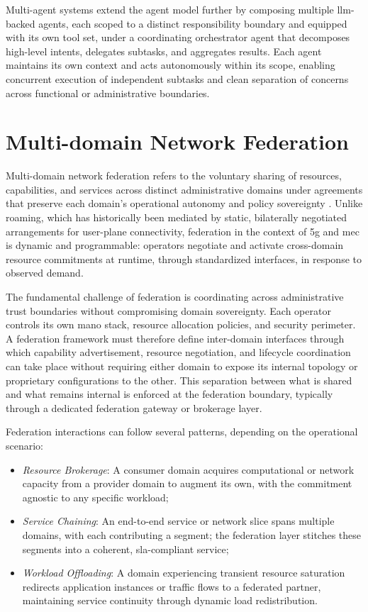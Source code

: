 Multi-agent systems extend the agent model further by composing multiple \ac{llm}-backed agents, each scoped to a distinct responsibility boundary and equipped with its own tool set, under a coordinating orchestrator agent that decomposes high-level intents, delegates subtasks, and aggregates results. Each agent maintains its own context and acts autonomously within its scope, enabling concurrent execution of independent subtasks and clean separation of concerns across functional or administrative boundaries.


\section{Multi-domain Network Federation}

Multi-domain network federation refers to the voluntary sharing of resources, capabilities, and services across distinct administrative domains under agreements that preserve each domain's operational autonomy and policy sovereignty \cite{SantosNetworkfederationChallengesopportunities2024}. Unlike roaming, which has historically been mediated by static, bilaterally negotiated arrangements for user-plane connectivity, federation in the context of \ac{5g} and \ac{mec} is dynamic and programmable: operators negotiate and activate cross-domain resource commitments at runtime, through standardized interfaces, in response to observed demand.

The fundamental challenge of federation is coordinating across administrative trust boundaries without compromising domain sovereignty. Each operator controls its own \ac{mano} stack, resource allocation policies, and security perimeter. A federation framework must therefore define inter-domain interfaces through which capability advertisement, resource negotiation, and lifecycle coordination can take place without requiring either domain to expose its internal topology or proprietary configurations to the other. This separation between what is shared and what remains internal is enforced at the federation boundary, typically through a dedicated federation gateway or brokerage layer.

Federation interactions can follow several patterns, depending on the operational scenario:
\begin{itemize}
    \item \emph{Resource Brokerage}: A consumer domain acquires computational or network capacity from a provider domain to augment its own, with the commitment agnostic to any specific workload;
    \item \emph{Service Chaining}: An end-to-end service or network slice spans multiple domains, with each contributing a segment; the federation layer stitches these segments into a coherent, \ac{sla}-compliant service;
    \item \emph{Workload Offloading}: A domain experiencing transient resource saturation redirects application instances or traffic flows to a federated partner, maintaining service continuity through dynamic load redistribution.
\end{itemize}

